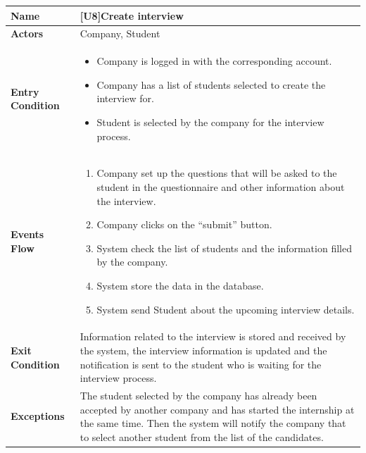 \begin{center}
    \begin{tabular}{|p{9em}|p{27em}|}
        \hline
        \rowcolor{bluepoli!40} %
        \textbf{Name} & \textbf{[U8]Create interview} \\
        \hline
        \textbf{Actors} & Company, Student \\
        \hline
        \textbf{Entry Condition} & 
        \begin{itemize}
            \item Company is logged in with the corresponding account.
            \item Company has a list of students selected to create the interview for.
            \item Student is selected by the company for the interview process.
        \end{itemize} \\
        \hline
        \textbf{Events Flow} & 
        \begin{enumerate}
            \item Company set up the questions that will be asked to the student in the questionnaire and other information about the interview.
            \item Company clicks on the ``submit'' button.
            \item System check the list of students and the information filled by the company.
            \item System store the data in the database.
            \item System send Student about the upcoming interview details.
        \end{enumerate} \\
        \hline
        \textbf{Exit Condition} & 
        Information related to the interview is stored and received by the system, the interview information is updated and the notification is 
        sent to the student who is waiting for the interview process.\\
        \hline
        \textbf{Exceptions} &
        The student selected by the company has already been accepted by another company and has started the internship at the same time.
        Then the system will notify the company that to select another student from the list of the candidates.\\
        \hline
    \end{tabular}
\end{center}

